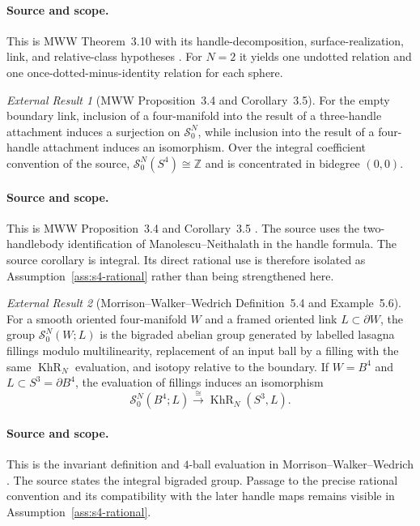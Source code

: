 \documentclass[10pt,reqno]{amsart}
\theoremstyle{definition}
\theoremstyle{remark}
\newtheorem{externalresult}{External Result}
\newcommand{\Z}{\mathbb Z}
\newcommand{\KhR}{\operatorname{KhR}}
\newcommand{\SLM}{\mathcal S}
\begin{document}
\paragraph{Source and scope.}
This is MWW Theorem~3.10 with its handle-decomposition, surface-realization,
link, and relative-class hypotheses \cite[Theorem~3.10]{MWW2023Handles}.
For $N=2$ it yields one undotted relation and one once-dotted-minus-identity
relation for each sphere.

\begin{externalresult}[MWW Proposition~3.4 and Corollary~3.5]\label{prop:mww-3.4}
For the empty boundary link, inclusion of a four-manifold into the result of a
three-handle attachment induces a surjection on $\SLM^N_0$, while inclusion
into the result of a four-handle attachment induces an isomorphism.  Over the
integral coefficient convention of the source,
$\SLM^N_0(S^4)\cong\Z$ and is concentrated in bidegree $(0,0)$.
\end{externalresult}

\paragraph{Source and scope.}
This is MWW Proposition~3.4 and Corollary~3.5
\cite[Proposition~3.4 and Corollary~3.5]{MWW2023Handles}.  The source
uses the two-handlebody identification of
Manolescu--Neithalath \cite[Proposition~2.1]{MN2022} in the handle formula.
The source
corollary is integral.  Its direct rational use is therefore isolated as
Assumption~\ref{ass:s4-rational} rather than being strengthened here.

\begin{externalresult}[Morrison--Walker--Wedrich Definition~5.4 and Example~5.6]\label{prop:mww-B4}
For a smooth oriented four-manifold $W$ and a framed oriented link
$L\subset\partial W$, the group $\SLM^N_0(W;L)$ is the bigraded abelian group
generated by labelled lasagna fillings modulo multilinearity, replacement of
an input ball by a filling with the same $\KhR_N$ evaluation, and isotopy
relative to the boundary.  If $W=B^4$ and $L\subset S^3=\partial B^4$, the
evaluation of fillings induces an isomorphism
\begin{equation}\label{eq:B4-evaluation}
\SLM^N_0(B^4;L)\xrightarrow{\cong}\KhR_N(S^3,L).
\end{equation}
\end{externalresult}

\paragraph{Source and scope.}
This is the invariant definition and $4$-ball evaluation in
Morrison--Walker--Wedrich \cite[Definition~5.4 and Example~5.6]{MWW2022Invariants}.
The source states the integral bigraded group.  Passage to the precise
rational convention and its compatibility with the later handle maps remains
visible in Assumption~\ref{ass:s4-rational}.
\end{document}
